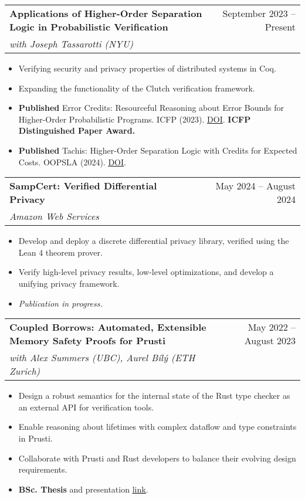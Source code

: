 \documentclass[letterpaper,11pt]{article}
\makeatletter
\newcommand{\resumeItem}[1]{
  \item\small{
    {#1 \vspace{-2pt}}
  }
}
\newcommand{\resumeSubheading}[4]{
  \vspace{-2pt}\item
    \begin{tabular*}{0.97\textwidth}[t]{l@{\extracolsep{\fill}}r}
      \textbf{#1} & #2 \\
      \textit{\small#3} & \textit{\small #4} \\
    \end{tabular*}\vspace{-7pt}
}
\newcommand{\resumeSubSubheading}[2]{
    \item
    \begin{tabular*}{0.97\textwidth}{l@{\extracolsep{\fill}}r}
      \textit{\small#1} & \textit{\small #2} \\
    \end{tabular*}\vspace{-7pt}
}
\newcommand{\resumeSubHeadingListEnd}{\end{itemize}}
\newcommand{\resumeItemListStart}{\begin{itemize}}
\newcommand{\resumeItemListEnd}{\end{itemize}\vspace{-5pt}}
\makeatother
\begin{document}
    \resumeSubheading
      {Applications of Higher-Order Separation Logic in Probabilistic Verification}{September 2023 -- Present}
      {with Joseph Tassarotti (NYU)}{}
      \resumeItemListStart
        \resumeItem{Verifying security and privacy properties of distributed systems in Coq.}
        \resumeItem{Expanding the functionality of the Clutch verification framework.}
        \resumeItem{\textbf{Published} Error Credits: Resourceful Reasoning about Error Bounds for Higher-Order Probabilistic Programs. ICFP (2023). \href{https://dl.acm.org/doi/10.1145/3674635}{\ul{DOI}}. \textbf{ICFP Distinguished Paper Award.}}
        \resumeItem{\textbf{Published}  Tachis: Higher-Order Separation Logic with Credits for Expected Costs. OOPSLA (2024). \href{https://dl.acm.org/doi/10.1145/3689753}{\ul{DOI}}.}
      \resumeItemListEnd
    \resumeSubheading
      {SampCert: Verified Differential Privacy}{May 2024 -- August 2024}
      {Amazon Web Services}{}
      \resumeItemListStart
        \resumeItem{Develop and deploy a discrete differential privacy library, verified using the Lean 4 theorem prover. }
        \resumeItem{Verify high-level privacy results, low-level optimizations, and develop a unifying privacy framework. }
        \resumeItem{\textit{Publication in progress.}}
      \resumeItemListEnd
      

    \resumeSubheading
      {Coupled Borrows: Automated, Extensible Memory Safety Proofs for Prusti}{May 2022 -- August 2023}
      {with Alex Summers (UBC), Aurel Bílý (ETH Zurich)}{}
      \resumeItemListStart
        \resumeItem{Design a robust semantics for the internal state of the Rust type checker as an external API for verification tools.}
        \resumeItem{Enable reasoning about lifetimes with complex dataflow and type constraints in Prusti.}
        \resumeItem{Collaborate with Prusti and Rust developers to balance their evolving design requirements.}
        \resumeItem{\textbf{BSc. Thesis} and presentation \href{https://www.markusde.ca/pages/bscthesis.html}{\ul{link}}.}
    \resumeItemListEnd
\end{document}
